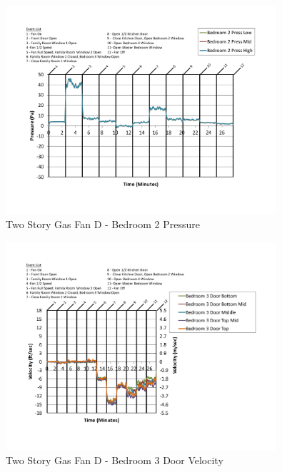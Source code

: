 \documentclass{article}
\begin{document}
\begin{appendices}
	\begin{figure}[H]
		\centering
		\includegraphics[height=3.05in,trim=0.67in 1.1in 0.67in 0.8in,clip=true]{0_Images/Results_Charts/ColdFlow/Two_Story/Gas/D/Bedroom_2_Pressure.pdf}
		\caption{Two Story Gas Fan D - Bedroom 2 Pressure}
	\end{figure}
 

	\begin{figure}[H]
		\centering
		\includegraphics[height=3.05in,trim=0.67in 1.1in 0.67in 0.8in,clip=true]{0_Images/Results_Charts/ColdFlow/Two_Story/Gas/D/Bedroom_3_Door_Velocity.pdf}
		\caption{Two Story Gas Fan D - Bedroom 3 Door Velocity}
	\end{figure}
 
	\clearpage


\end{appendices}
\end{document}
